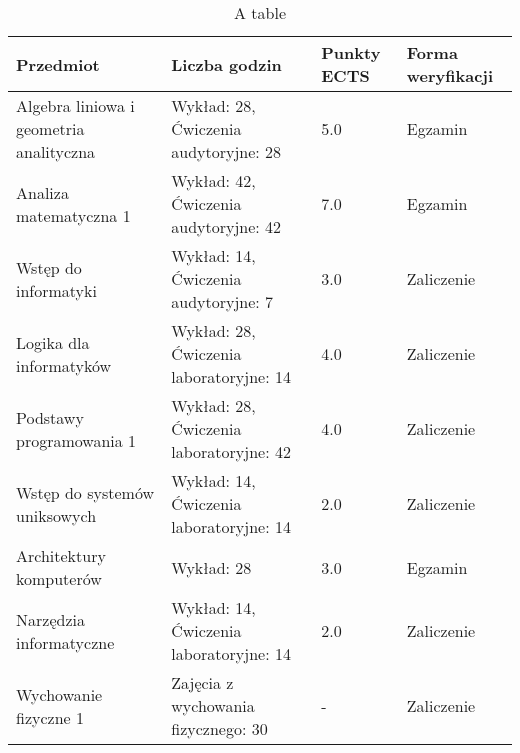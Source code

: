 
\begin{table}[h]
    \centering
    \begin{tabular}{|p{4cm}|p{4cm}|l|l|}
    \hline
        Przedmiot & Liczba godzin & Punkty ECTS & Forma weryfikacji \\ \hline
        Algebra liniowa i geometria analityczna & Wykład: 28, Ćwiczenia audytoryjne: 28 & 5.0 & Egzamin \\ \hline
        Analiza matematyczna 1 & Wykład: 42, Ćwiczenia audytoryjne: 42 & 7.0 & Egzamin \\ \hline
        Wstęp do informatyki & Wykład: 14, Ćwiczenia audytoryjne: 7 & 3.0 & Zaliczenie \\ \hline
        Logika dla informatyków & Wykład: 28, Ćwiczenia laboratoryjne: 14 & 4.0 & Zaliczenie \\ \hline
        Podstawy programowania 1 & Wykład: 28, Ćwiczenia laboratoryjne: 42 & 4.0 & Zaliczenie \\ \hline
        Wstęp do systemów uniksowych & Wykład: 14, Ćwiczenia laboratoryjne: 14 & 2.0 & Zaliczenie \\ \hline
        Architektury komputerów & Wykład: 28 & 3.0 & Egzamin \\ \hline
        Narzędzia informatyczne & Wykład: 14, Ćwiczenia laboratoryjne: 14 & 2.0 & Zaliczenie \\ \hline
        Wychowanie fizyczne 1 & Zajęcia z wychowania fizycznego: 30 & - & Zaliczenie \\ \hline
    \end{tabular}
    \caption{A table}

    \label{tabela1}
\end{table}
    